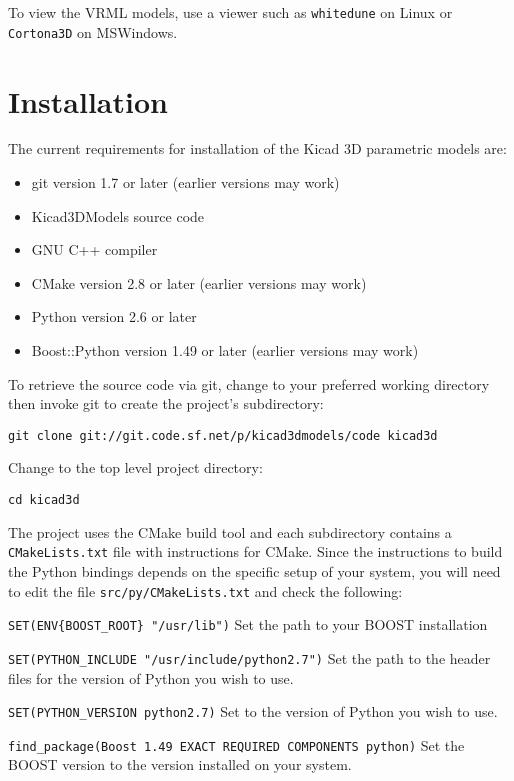 \documentclass[a4paper, dvipdfm]{article}
\begin{document}
To view the VRML models, use a viewer such as \verb#whitedune# on Linux or \verb#Cortona3D#
on MSWindows.

\section{Installation}
The current requirements for installation of the Kicad 3D parametric models are:
\begin{itemize}
\item git version 1.7 or later (earlier versions may work)\\
\item Kicad3DModels source code\\
\item GNU C++ compiler\\
\item CMake version 2.8 or later (earlier versions may work)\\
\item Python version 2.6 or later\\
\item Boost::Python version 1.49 or later (earlier versions may work)\\
\end{itemize}

To retrieve the source code via git, change to your preferred working directory
then invoke git to create the project's subdirectory:

\verb#git clone git://git.code.sf.net/p/kicad3dmodels/code kicad3d#

Change to the top level project directory:

\verb#cd kicad3d#

The project uses the CMake build tool and each subdirectory contains a
\verb#CMakeLists.txt# file with instructions for CMake. Since the 
instructions to build the Python bindings depends on the specific setup
of your system, you will need to edit the file \verb#src/py/CMakeLists.txt#
and check the following:

\verb#SET(ENV{BOOST_ROOT} "/usr/lib")# Set the path to your BOOST installation

\verb#SET(PYTHON_INCLUDE "/usr/include/python2.7")# Set the path to the header
files for the version of Python you wish to use.

\verb#SET(PYTHON_VERSION python2.7)# Set to the version of Python you wish to use.

\verb#find_package(Boost 1.49 EXACT REQUIRED COMPONENTS python)# Set the BOOST version
to the version installed on your system.
\end{document}
